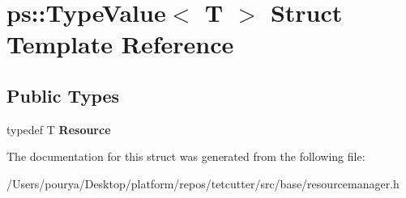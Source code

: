 \hypertarget{structps_1_1TypeValue}{}\section{ps\+:\+:Type\+Value$<$ T $>$ Struct Template Reference}
\label{structps_1_1TypeValue}
\subsection*{Public Types}
\begin{DoxyCompactItemize}
\item 
\hypertarget{structps_1_1TypeValue_a5584d02559097a9c20ba0f9a160b6df2}{}typedef T {\bfseries Resource}\label{structps_1_1TypeValue_a5584d02559097a9c20ba0f9a160b6df2}

\end{DoxyCompactItemize}


The documentation for this struct was generated from the following file\+:\begin{DoxyCompactItemize}
\item 
/\+Users/pourya/\+Desktop/platform/repos/tetcutter/src/base/resourcemanager.\+h\end{DoxyCompactItemize}
